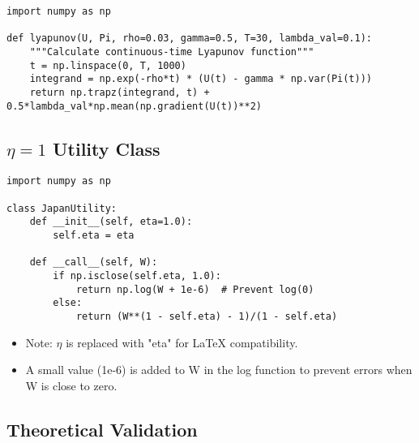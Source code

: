 \documentclass[10pt]{article}
\theoremstyle{definition}
\begin{document}
\begin{lstlisting}[caption={Python Code for Lyapunov Function Calculation}]
import numpy as np

def lyapunov(U, Pi, rho=0.03, gamma=0.5, T=30, lambda_val=0.1):
    """Calculate continuous-time Lyapunov function"""
    t = np.linspace(0, T, 1000)
    integrand = np.exp(-rho*t) * (U(t) - gamma * np.var(Pi(t)))
    return np.trapz(integrand, t) + 0.5*lambda_val*np.mean(np.gradient(U(t))**2)
\end{lstlisting}

\subsection{$\eta = 1$ Utility Class}

\begin{lstlisting}[caption={Python Class for $\eta = 1$ Utility}]
import numpy as np

class JapanUtility:
    def __init__(self, eta=1.0):
        self.eta = eta

    def __call__(self, W):
        if np.isclose(self.eta, 1.0):
            return np.log(W + 1e-6)  # Prevent log(0)
        else:
            return (W**(1 - self.eta) - 1)/(1 - self.eta)
\end{lstlisting}

\begin{itemize}
    \item Note: $\eta$ is replaced with "eta" for LaTeX compatibility.
    \item A small value (1e-6) is added to W in the log function to prevent errors when W is close to zero.
\end{itemize}

\subsection{Theoretical Validation}
\end{document}
